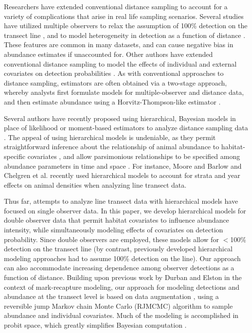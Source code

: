 \documentclass[10pt]{article}
\begin{document}
Researchers have extended conventional distance sampling to account for a variety of complications that arise in real life sampling scenarios.  Several studies have utilized multiple observers to relax the assumption of 100\% detection on the transect line \cite{BorchersEtAl1998}, and to model heterogeneity in detection as a function of distance \cite{LaakeBorchers2004,BorchersEtAl2006,BucklandEtAl2010}.  These features are common in many datasets, and can cause negative bias in abundance estimates if unaccounted for.  Other authors have extended conventional distance sampling to model the effects of individual and external covariates on detection probabilities \cite{DrummerMcdonald1987,RamseyEtAl1987,MarquesBuckland2003}.  As with conventional approaches to distance sampling, estimators are often obtained via a two-stage approach, whereby analysts first formulate models for multiple-observer and distance data, and then estimate abundance using a Horvitz-Thompson-like estimator \cite{Huggins1989,Alho1990}.

Several authors have recently proposed using hierarchical, Bayesian models in place of likelihood or moment-based estimators to analyze distance sampling data \cite{RoyleDorazio2008,LinkBarker2010,RoyleDorazio2010,MooreBarlow2011,ChelgrenEtAl2011,SchmidtEtAl2012}. The appeal of using hierarchical models is undeniable, as they permit straightforward inference about the relationship of animal abundance to habitat-specific covariates \cite{RoyleEtAl2004}, and allow parsimonious relationships to be specified among abundance parameters in time and space \cite{RoyleEtAl2007}.
For instance, Moore and Barlow \cite{MooreBarlow2011} and Chelgren et al. \cite{ChelgrenEtAl2011} recently used hierarchical models to account for strata and year effects on animal densities when analyzing line transect data.

Thus far, attempts to analyze line transect data with hierarchical models have focused on single observer data.  In this paper, we develop hierarchical models for double observer data that permit habitat covariates to influence abundance intensity, while simultaneously modeling effects of covariates on detection probability.  Since double observers are employed, these models allow for $<$100\% detection on the transect line (by contrast, previously developed hierarchical modeling approaches had to assume 100\% detection on the line).  Our approach can also accommodate increasing dependence among observer detections as a function of distance.  Building upon previous work by Durban and Elston \cite{DurbanElston2005} in the context of mark-recapture modeling, our approach for modeling detections and abundance at the transect level is based on data augmentation \cite{TannerWong1987,RoyleEtAl2007b}, using a reversible jump Markov chain Monte Carlo (RJMCMC) algorithm \cite{CarlinChib1995,Green1995} to sample abundance and individual covariates.  Much of the modeling is accomplished in probit space, which greatly simplifies Bayesian computation \cite{AlbertChib1993}.
\end{document}

